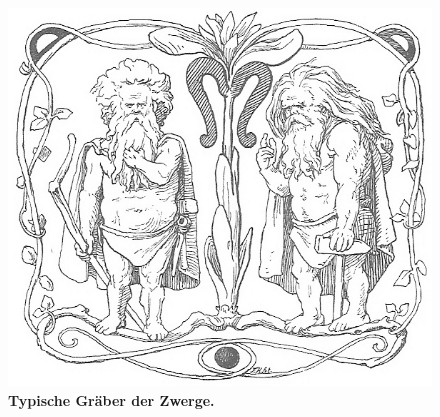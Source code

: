 \begin{figure}
	\centering
	\includegraphics[width=0.7\linewidth]{Abbildungen/Weltenbau/Lebensformen/ZwergGraeber.png}
	\caption{\textbf{Typische Gräber der Zwerge.}}
	\label{fig:zwerggraeber}
\end{figure}

